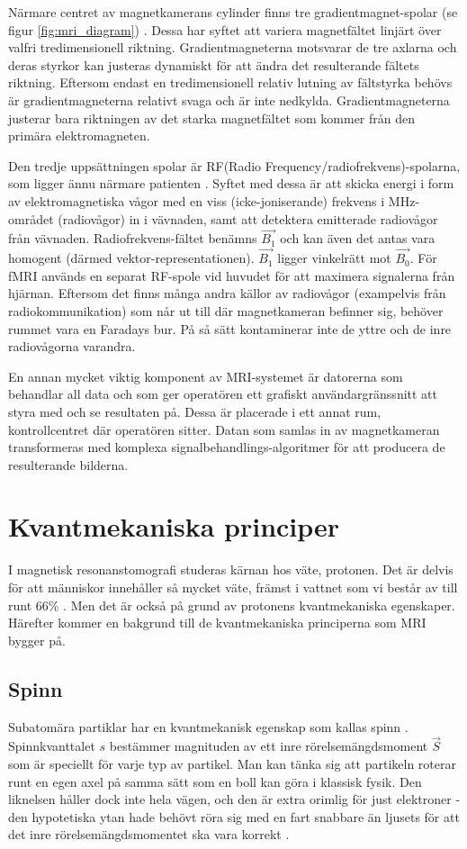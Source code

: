\documentclass[11pt, a4paper]{article}
\begin{document}
Närmare centret av magnetkamerans cylinder finns tre gradient\-magnet-spolar (se figur \ref{fig:mri_diagram}) \parencite{understanding_mri}. Dessa har syftet att variera magnetfältet linjärt över valfri tredimensionell riktning. Gradientmagneterna motsvarar de tre axlarna och deras styrkor kan justeras dynamiskt för att ändra det resulterande fältets riktning. Eftersom endast en tredimensionell relativ lutning av fältstyrka behövs är gradientmagneterna relativt svaga och är inte nedkylda. Gradientmagneterna justerar bara riktningen av det starka magnetfältet som kommer från den primära elektromagneten.

Den tredje uppsättningen spolar är RF(Radio Frequency/radiofrekvens)-spolarna, som ligger ännu närmare patienten \parencite{understanding_mri}. Syftet med dessa är att skicka energi i form av elektromagnetiska vågor med en viss (icke-joniserande) frekvens i MHz-området (radiovågor) in i vävnaden, samt att detektera emitterade radiovågor från vävnaden. Radiofrekvens-fältet benämns $\vec{B_1}$ och kan även det antas vara homogent (därmed vektor-representationen). $\vec{B_1}$ ligger vinkelrätt mot $\vec{B_0}$. För fMRI används en separat RF-spole vid huvudet för att maximera signalerna från hjärnan. Eftersom det finns många andra källor av radiovågor (exampelvis från radio\-kommunikation) som når ut till där magnetkameran befinner sig, behöver rummet vara en Faradays bur. På så sätt kontaminerar inte de yttre och de inre radiovågorna varandra.

En annan mycket viktig komponent av MRI-systemet är datorerna som behandlar all data och som ger operatören ett grafiskt användargränssnitt att styra med och se resultaten på. Dessa är placerade i ett annat rum, kontrollcentret där operatören sitter. Datan som samlas in av magnetkameran transformeras med komplexa signalbehandlings-algoritmer för att producera de resulterande bilderna.

\clearpage
\section{Kvantmekaniska principer}
I magnetisk resonanstomografi studeras kärnan hos väte, protonen. Det är delvis för att människor innehåller så mycket väte, främst i vattnet som vi består av till runt 66\% \parencite{mri_nobelpris_pressmeddelande}. Men det är också på grund av protonens kvantmekaniska egenskaper. Härefter kommer en bakgrund till de kvantmekaniska principerna som MRI bygger på.

\subsection{Spinn}
Subatomära partiklar har en kvantmekanisk egenskap som kallas spinn \parencite{college_physics}. Spinnkvanttalet $s$ bestämmer magnituden av ett inre rörelsemängdsmoment $\vec{S}$ som är speciellt för varje typ av partikel. Man kan tänka sig att partikeln roterar runt en egen axel på samma sätt som en boll kan göra i klassisk fysik. Den liknelsen håller dock inte hela vägen, och den är extra orimlig för just elektroner - den hypotetiska ytan hade behövt röra sig med en fart snabbare än ljusets för att det inre rörelsemängdsmomentet ska vara korrekt \parencite{electron_spin}. 
\end{document}
